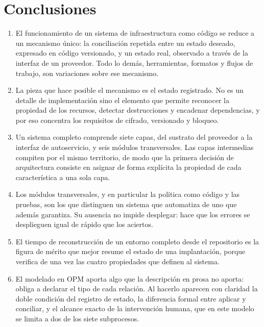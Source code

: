 \documentclass[11pt,letterpaper]{article}
\begin{document}
\section{Conclusiones}

\begin{enumerate}
  \item El funcionamiento de un sistema de infraestructura como código se
    reduce a un mecanismo único: la conciliación repetida entre un estado
    deseado, expresado en código versionado, y un estado real, observado a
    través de la interfaz de un proveedor. Todo lo demás, herramientas,
    formatos y flujos de trabajo, son variaciones sobre ese mecanismo.
  \item La pieza que hace posible el mecanismo es el estado registrado. No es
    un detalle de implementación sino el elemento que permite reconocer la
    propiedad de los recursos, detectar destrucciones y encadenar dependencias,
    y por eso concentra los requisitos de cifrado, versionado y bloqueo.
  \item Un sistema completo comprende siete capas, del sustrato del proveedor
    a la interfaz de autoservicio, y seis módulos transversales. Las capas
    intermedias compiten por el mismo territorio, de modo que la primera
    decisión de arquitectura consiste en asignar de forma explícita la
    propiedad de cada característica a una sola capa.
  \item Los módulos transversales, y en particular la política como código y
    las pruebas, son los que distinguen un sistema que automatiza de uno que
    además garantiza. Su ausencia no impide desplegar: hace que los errores se
    desplieguen igual de rápido que los aciertos.
  \item El tiempo de reconstrucción de un entorno completo desde el
    repositorio es la figura de mérito que mejor resume el estado de una
    implantación, porque verifica de una vez las cuatro propiedades que
    definen al sistema.
  \item El modelado en OPM aporta algo que la descripción en prosa no aporta:
    obliga a declarar el tipo de cada relación. Al hacerlo aparecen con
    claridad la doble condición del registro de estado, la diferencia formal
    entre aplicar y conciliar, y el alcance exacto de la intervención humana,
    que en este modelo se limita a dos de los siete subprocesos.
\end{enumerate}

\printbibliography[title={Referencias bibliográficas}]
\end{document}
